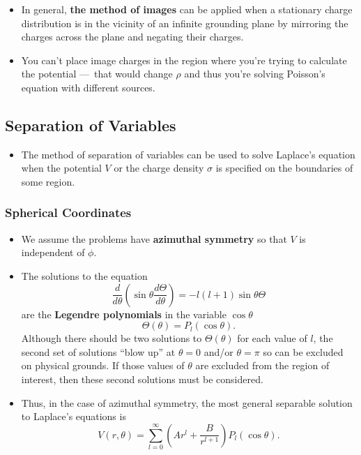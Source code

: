 \documentclass{article}
\begin{document}
\begin{itemize}
  \item In general, \textbf{the method of images} can be applied when a stationary charge distribution is in the vicinity of an infinite grounding plane by mirroring the charges across the plane and negating their charges.

  \item You can't place image charges in the region where you're trying to calculate the potential — that would change $\rho$ and thus you're solving Poisson's equation with different sources.
\end{itemize}

\subsection{Separation of Variables}

\begin{itemize}
  \item The method of separation of variables can be used to solve Laplace's equation when the potential $V$ or the charge density $\sigma$ is specified on the boundaries of some region.
\end{itemize}

\setcounter{subsubsection}{1}
\subsubsection{Spherical Coordinates}

\begin{itemize}
  \item We assume the problems have \textbf{azimuthal symmetry} so that $V$ is independent of $\phi$.

  \item The solutions to the equation \[\frac{d}{d \theta} \left( \sin \theta \frac{d \Theta}{d \theta} \right) = -l (l + 1) \sin \theta \Theta\] are the \textbf{Legendre polynomials} in the variable $\cos \theta$ \[\Theta(\theta) = P_l(\cos \theta).\] Although there should be two solutions to $\Theta(\theta)$ for each value of $l$, the second set of solutions ``blow up'' at $\theta = 0$ and/or $\theta = \pi$ so can be excluded on physical grounds. If those values of $\theta$ are excluded from the region of interest, then these second solutions must be considered.

  \item Thus, in the case of azimuthal symmetry, the most general separable solution to Laplace's equations is \[V(r, \theta) = \sum_{l = 0}^\infty \left( A r^l + \frac{B}{r^{l + 1}} \right) P_l (\cos \theta).\]
\end{itemize}
\end{document}
